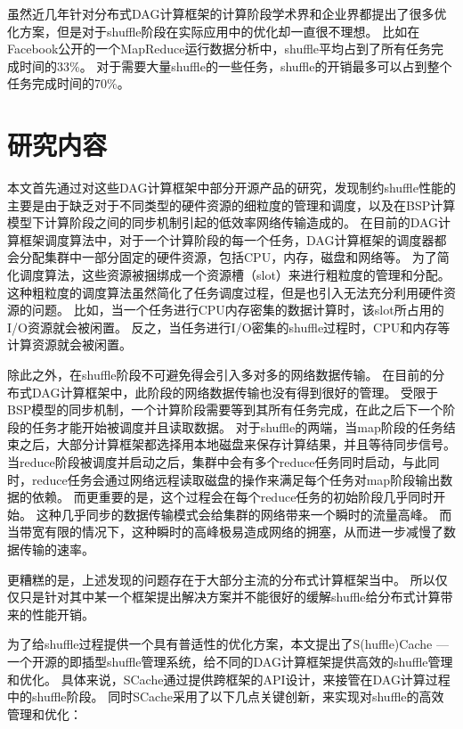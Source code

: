 虽然近几年针对分布式DAG计算框架的计算阶段学术界和企业界都提出了很多优化方案\cite{pacman, babu, quincy, sync}，但是对于shuffle阶段在实际应用中的优化却一直很不理想。
比如在Facebook公开的一个MapReduce运行数据分析中，shuffle平均占到了所有任务完成时间的33\%。
对于需要大量shuffle的一些任务，shuffle的开销最多可以占到整个任务完成时间的70\%\cite{managing}。



\section{研究内容}

本文首先通过对这些DAG计算框架中部分开源产品的研究，发现制约shuffle性能的主要是由于缺乏对于不同类型的硬件资源的细粒度的管理和调度，以及在BSP计算模型下计算阶段之间的同步机制引起的低效率网络传输造成的。
在目前的DAG计算框架调度算法中，对于一个计算阶段的每一个任务，DAG计算框架的调度器都会分配集群中一部分固定的硬件资源，包括CPU，内存，磁盘和网络等。
为了简化调度算法，这些资源被捆绑成一个资源槽（slot）来进行粗粒度的管理和分配。
这种粗粒度的调度算法虽然简化了任务调度过程，但是也引入无法充分利用硬件资源的问题。
比如，当一个任务进行CPU内存密集的数据计算时，该slot所占用的I/O资源就会被闲置。
反之，当任务进行I/O密集的shuffle过程时，CPU和内存等计算资源就会被闲置。

除此之外，在shuffle阶段不可避免得会引入多对多的网络数据传输。
在目前的分布式DAG计算框架中，此阶段的网络数据传输也没有得到很好的管理。
受限于BSP模型的同步机制，一个计算阶段需要等到其所有任务完成，在此之后下一个阶段的任务才能开始被调度并且读取数据。
对于shuffle的两端，当map阶段的任务结束之后，大部分计算框架都选择用本地磁盘来保存计算结果，并且等待同步信号。
当reduce阶段被调度并启动之后，集群中会有多个reduce任务同时启动，与此同时，reduce任务会通过网络远程读取磁盘的操作来满足每个任务对map阶段输出数据的依赖。
而更重要的是，这个过程会在每个reduce任务的初始阶段几乎同时开始。
这种几乎同步的数据传输模式会给集群的网络带来一个瞬时的流量高峰。
而当带宽有限的情况下，这种瞬时的高峰极易造成网络的拥塞，从而进一步减慢了数据传输的速率。

更糟糕的是，上述发现的问题存在于大部分主流的分布式计算框架当中。
所以仅仅只是针对其中某一个框架提出解决方案并不能很好的缓解shuffle给分布式计算带来的性能开销。

为了给shuffle过程提供一个具有普适性的优化方案，本文提出了S(huffle)Cache --- 一个开源的即插型shuffle管理系统，给不同的DAG计算框架提供高效的shuffle管理和优化。
具体来说，SCache通过提供跨框架的API设计，来接管在DAG计算过程中的shuffle阶段。
同时SCache采用了以下几点关键创新，来实现对shuffle的高效管理和优化：

